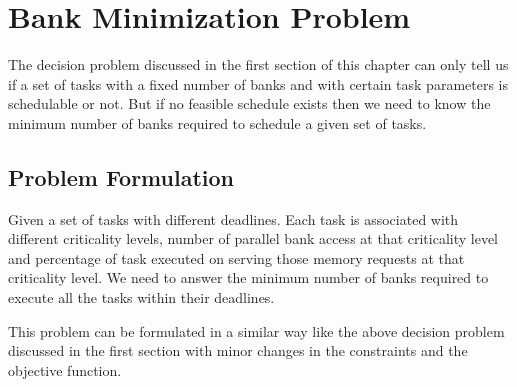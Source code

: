 \section{Bank Minimization Problem}\label{bmp}
\noindent
The decision problem discussed in the first section of this chapter can only tell us if a set of tasks with a fixed number of 
banks and with certain task parameters is schedulable or not. But if no feasible schedule exists then we need to know the 
minimum number of banks required to schedule a given set of tasks.

\subsection{Problem Formulation}\label{pf1}
\begin{problem}
    Given a set of tasks with different deadlines. Each task is associated with different criticality levels, number of 
    parallel bank access at that criticality level and percentage of task executed on serving those memory requests at that 
    criticality level. We need to answer the minimum number of banks required to execute all the tasks within their deadlines.
\end{problem}
This problem can be formulated in a similar way like the above decision problem discussed in the first section with minor 
changes in the constraints and the objective function.

